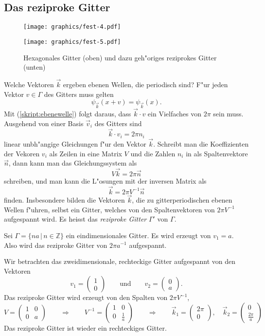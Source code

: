 \subsection{Das reziproke Gitter}
\begin{figure}
\centering
\texttt{[image: graphics/fest-4.pdf]}
\bigskip

\texttt{[image: graphics/fest-5.pdf]}
\caption{Hexagonales Gitter (oben) und dazu geh"origes reziprokes Gitter
(unten)
\label{skript:hexagonalesgitter}}
\end{figure}
Welche Vektoren $\vec k$ ergeben ebenen Wellen, die periodisch sind?
F"ur jeden Vektor $v\in\Gamma$ des Gitters muss gelten
\[
\psi_{\vec k}(x+v)=\psi_{\vec k}(x).
\]
Mit (\ref{skript:ebenewelle}) folgt daraus, dass
$\vec k\cdot v$ ein Vielfaches von $2\pi$ sein muss.
Ausgehend von einer Basis $\vec v_i$ des Gitters sind
\[
\vec k\cdot v_i=2\pi n_i
\]
linear unbh"angige Gleichungen f"ur den Vektor $\vec k$. Schreibt man
die Koeffizienten der Vekoren $v_i$ als Zeilen in eine Matrix $V$
und die Zahlen $n_i$ in als Spaltenvektore $\vec n$,
dann kann man das Gleichungssystem als
\[
V\vec k=2\pi\vec n
\]
schreiben, und man kann die L"osungen mit der inversen Matrix als
\[
\vec k = 2\pi V^{-1}\vec n
\]
finden.
Insbesondere bilden die Vektoren $\vec k$, die zu gitterperiodischen
ebenen Wellen f"uhren, selbst ein Gitter, welches von den Spaltenvektoren
von $2\pi V^{-1}$ aufgespannt wird.
Es heisst das {\em reziproke Gitter} $\Gamma'$ von $\Gamma$.
%

\begin{beispiel}
Sei $\Gamma = \{ na\,|\, n\in\mathbb Z\}$ ein eindimensionales Gitter.
Es wird erzeugt von $v_1=a$.
Also wird das reziproke Gitter von $2\pi a^{-1}$ aufgespannt.
\end{beispiel}

\begin{beispiel}
Wir betrachten das zweidimensionale, rechteckige Gitter
aufgespannt von den Vektoren
\[
v_1=\begin{pmatrix}1\\0\end{pmatrix}
\qquad\text{und}\qquad
v_2=\begin{pmatrix}0\\a\end{pmatrix}.
\]
Das reziproke Gitter wird erzeugt von den Spalten von $2\pi V^{-1}$,
\[
V=\begin{pmatrix} 1&0\\ 0&a \end{pmatrix}
\qquad\Rightarrow\qquad
V^{-1}=\begin{pmatrix}1&0\\0&\frac1a\end{pmatrix}
\qquad\Rightarrow\qquad
\vec k_1=\begin{pmatrix}2\pi\\0\end{pmatrix},\quad
\vec k_2=\begin{pmatrix}0\\\frac{2\pi}a\end{pmatrix}
\]
Das reziproke Gitter ist wieder ein rechteckiges Gitter.
\end{beispiel}

